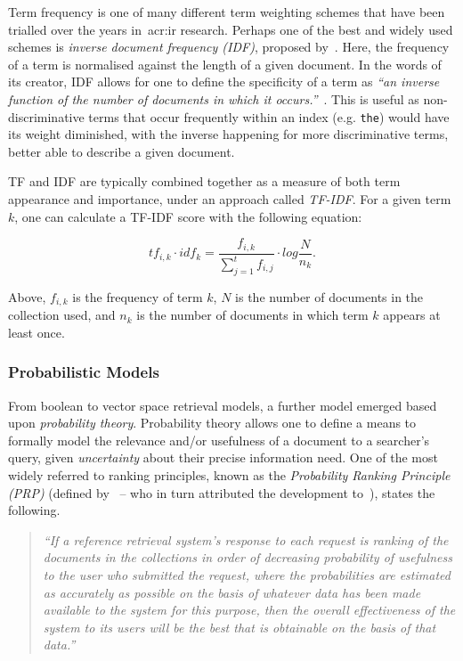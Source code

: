 Term frequency is one of many different term weighting schemes that have been trialled over the years in~\gls{acr:ir} research. Perhaps one of the best and widely used schemes is \emph{inverse document frequency (IDF)}, proposed by~\cite{sparck1972statistical}. Here, the frequency of a term is normalised against the length of a given document. In the words of its creator, IDF allows for one to define the specificity of a term as \emph{``an inverse function of the number of documents in which it occurs.''}~\citep{sparck1972statistical}. This is useful as non-discriminative terms that occur frequently within an index (e.g. \texttt{the}) would have its weight diminished, with the inverse happening for more discriminative terms, better able to describe a given document.

TF and IDF are typically combined together as a measure of both term appearance and importance, under an approach called \emph{TF-IDF}. For a given term $k$, one can calculate a TF-IDF score with the following equation:

\begin{equation*}
tf_{i,k} \cdot idf_{k} = \frac{f_{i,k}}{\sum_{j=1}^{t} f_{i,j}} \cdot log \frac{N}{n_k}.
\end{equation*}

Above, $f_{i,k}$ is the frequency of term $k$, $N$ is the number of documents in the collection used, and $n_k$ is the number of documents in which term $k$ appears at least once.

\subsubsection{Probabilistic Models}
From boolean to vector space retrieval models, a further model emerged based upon \emph{probability theory}. Probability theory allows one to define a means to formally model the relevance and/or usefulness of a document to a searcher's query, given \emph{uncertainty} about their precise information need. One of the most widely referred to ranking principles, known as the \emph{Probability Ranking Principle (PRP)} (defined by~\cite{robertson1977prp} -- who in turn attributed the development to~\cite{cooper1971relevance}), states the following.

\begin{quote}
\emph{``If a reference retrieval system's response to each request is ranking of the documents in the collections in order of decreasing probability of usefulness to the user who submitted the request, where the probabilities are estimated as accurately as possible on the basis of whatever data has been made available to the system for this purpose, then the overall effectiveness of the system to its users will be the best that is obtainable on the basis of that data.''}
\end{quote}


